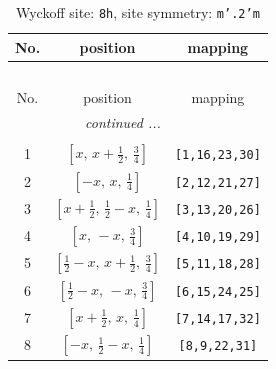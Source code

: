 \documentclass[fleqn,8pt]{jsarticle}
\begin{document}
\begin{longtable}{ccc}
\caption{Wyckoff site: {\tt 8h}, site symmetry: {\tt m'.2'm}}
 \\
 \hline \hline
No. & position & mapping \\ \hline \endfirsthead

\multicolumn{2}{l}{\tablename\ \thetable{}} \\
 \hline \hline
No. & position & mapping \\ \hline \endhead

 \hline \hline
\multicolumn{2}{r}{\footnotesize\it continued ...} \\ \endfoot

 \hline \hline
\multicolumn{2}{r}{} \\ \endlastfoot

1 & $\left[ x,\, x + \frac{1}{2},\, \frac{3}{4} \right]$ & {\tt [1,16,23,30]} \\ \hline
2 & $\left[ - x,\, x,\, \frac{1}{4} \right]$ & {\tt [2,12,21,27]} \\ \hline
3 & $\left[ x + \frac{1}{2},\, \frac{1}{2} - x,\, \frac{1}{4} \right]$ & {\tt [3,13,20,26]} \\ \hline
4 & $\left[ x,\, - x,\, \frac{3}{4} \right]$ & {\tt [4,10,19,29]} \\ \hline
5 & $\left[ \frac{1}{2} - x,\, x + \frac{1}{2},\, \frac{3}{4} \right]$ & {\tt [5,11,18,28]} \\ \hline
6 & $\left[ \frac{1}{2} - x,\, - x,\, \frac{3}{4} \right]$ & {\tt [6,15,24,25]} \\ \hline
7 & $\left[ x + \frac{1}{2},\, x,\, \frac{1}{4} \right]$ & {\tt [7,14,17,32]} \\ \hline
8 & $\left[ - x,\, \frac{1}{2} - x,\, \frac{1}{4} \right]$ & {\tt [8,9,22,31]} \\
\end{longtable}
\renewcommand{\arraystretch}{1.2}
\end{document}
